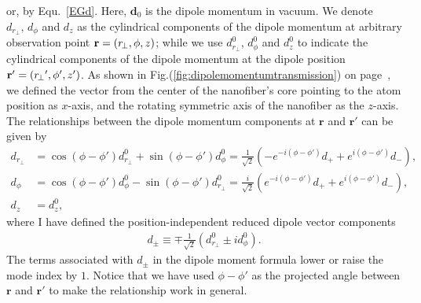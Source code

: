 \documentclass[]{report}
\begin{document}
or, by Equ.~\eqref{EGd}. Here, $ \mathbf{d}_0 $ is the dipole momentum in vacuum. We denote $d_{r\!_\perp},\, d_\phi$ and $d_z$ as the cylindrical components of the dipole momentum at arbitrary observation point ${\rm {\bf r}}=\left( {r\!_\perp ,\phi ,z}\right) $; while we use $d^0_{r\!_\perp}$, $d^0_\phi$ and $d^0_z$ to indicate the cylindrical components of the dipole momentum at the dipole position ${\rm 
{\bf {r}^{\prime }}}=\left( {{r\!_\perp }^{\prime },{\phi }^{\prime },{z}^{\prime }}\right) $. As shown in Fig.(\ref{fig:dipolemomentumtransmission}) on page~\pageref{fig:dipolemomentumtransmission}, we defined the vector from the center of the nanofiber's core pointing to the atom position as $x$-axis, and the rotating symmetric axis of the nanofiber as the $z$-axis. The relationships between the dipole momentum components at $\mathbf{r}$ and $\mathbf{r}'$ can be given by
\begin{align}
d_{r\!_\perp}\! &= \cos(\phi\!-\!\phi')d^0_{r\!_\perp}\!\!+\!\sin(\phi\!-\!\phi')d^0_\phi=\frac{1}{\sqrt{2}}\left(-e^{-i(\phi\!-\!\phi')}d_++e^{i(\phi\!-\!\phi')}d_- \right),\\
d_\phi &=\cos(\phi\!-\!\phi')d^0_\phi\!-\!\sin(\phi\!-\!\phi')d^0_{r\!_\perp}=\frac{i}{\sqrt{2}}\left(e^{-i(\phi\!-\!\phi')}d_++e^{i(\phi\!-\!\phi')}d_- \right),\\
d_z &= d^0_z,
\end{align}
where I have defined the position-independent reduced dipole vector components
\begin{align}
d_\pm \equiv \mp \frac{1}{\sqrt{2}}(d^0_{r\!_\perp}\pm id^0_{\phi}).
\end{align}
The terms associated with $d_\pm$ in the dipole moment formula lower or raise the mode index by $1$. Notice that we have used $\phi\!-\!\phi'$ as the projected angle between $\mathbf{r}$ and $\mathbf{r}'$ to make the relationship work in general. 
\end{document}
